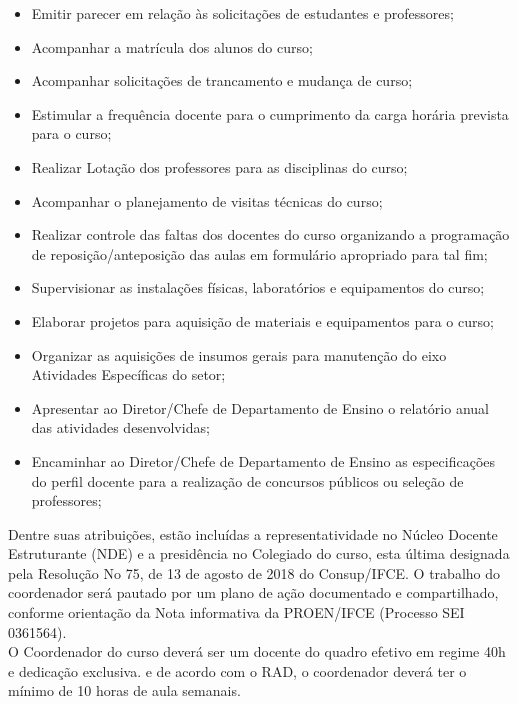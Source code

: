\begin{itemize}
\item Emitir parecer em relação às solicitações de estudantes e professores;
\item Acompanhar a matrícula dos alunos do curso;
\item Acompanhar solicitações de trancamento e mudança de curso;
\item Estimular a frequência docente para o cumprimento da carga horária prevista para o curso;
\item Realizar Lotação dos professores para as disciplinas do curso;
\item Acompanhar o planejamento de visitas técnicas do curso;
\item Realizar controle das faltas dos docentes do curso organizando a programação de reposição/anteposição das aulas em formulário apropriado para tal fim;
\item Supervisionar as instalações físicas, laboratórios e equipamentos do curso;
\item Elaborar projetos para aquisição de materiais e equipamentos para o curso;
\item Organizar as aquisições de insumos gerais para manutenção do eixo Atividades Específicas do setor;
\item Apresentar ao Diretor/Chefe de Departamento de Ensino o relatório anual das atividades desenvolvidas;
\item Encaminhar ao Diretor/Chefe de Departamento de Ensino as especificações do perfil docente para a realização de concursos públicos ou seleção de professores;
\end{itemize}

Dentre suas atribuições, estão incluídas a representatividade no Núcleo Docente Estruturante (NDE) e a presidência no Colegiado do curso, esta última designada pela Resolução No 75, de 13 de agosto de 2018 do Consup/IFCE. O trabalho do coordenador será pautado por um plano de ação documentado e compartilhado, conforme orientação da Nota informativa da PROEN/IFCE (Processo SEI 0361564).\\

O Coordenador do curso deverá ser um docente do quadro efetivo em regime 40h e dedicação exclusiva. e de acordo com o RAD, o coordenador deverá ter o mínimo de 10 horas de aula semanais.\\


%
%		
\imprimirindice


